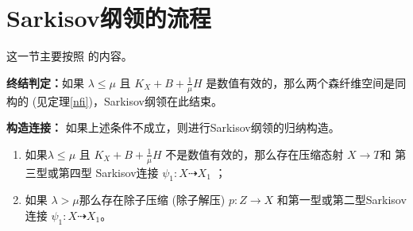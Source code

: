 \section{Sarkisov纲领的流程}
这一节主要按照 \cite[\S1]{brunoLogSarkisovProgram1995}的内容。

\textbf{终结判定：}如果 $ \lambda\leqslant\mu $ 且 $ K_X+B+\frac{1}{\mu}H $ 是数值有效的，那么两个森纤维空间是同构的 (见定理\ref{nfi})，Sarkisov纲领在此结束。

\textbf{构造连接：}
如果上述条件不成立，则进行Sarkisov纲领的归纳构造。
\begin{lemma}
  \begin{enumerate}
    \item 如果$ \lambda\leqslant\mu $ 且 $ K_X+B+\frac{1}{\mu}H $ 不是数值有效的，那么存在压缩态射 $X \to T$和 第三型或第四型 Sarkisov连接 $\psi_{1}:X\dashrightarrow X_{1}$ ；
    \item  如果 $ \lambda>\mu $那么存在除子压缩 (除子解压) $p:Z\to X$ 和第一型或第二型Sarkisov 连接 $ \psi_{1}:X\dashrightarrow X_{1}$。
  \end{enumerate}
\end{lemma}
